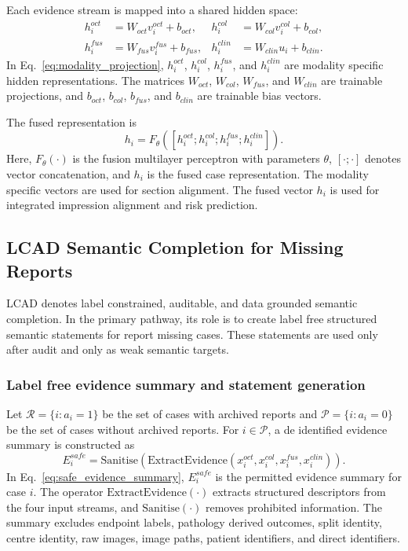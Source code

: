 Each evidence stream is mapped into a shared hidden space:
\begin{equation}
\begin{aligned}
h_i^{oct} &= W_{oct}v_i^{oct}+b_{oct}, &
h_i^{col} &= W_{col}v_i^{col}+b_{col},\\
h_i^{fus} &= W_{fus}v_i^{fus}+b_{fus}, &
h_i^{clin} &= W_{clin}u_i+b_{clin}.
\end{aligned}
\label{eq:modality_projection}
\end{equation}
In Eq.~\eqref{eq:modality_projection}, $h_i^{oct}$, $h_i^{col}$, $h_i^{fus}$, and $h_i^{clin}$ are modality specific hidden representations. The matrices $W_{oct}$, $W_{col}$, $W_{fus}$, and $W_{clin}$ are trainable projections, and $b_{oct}$, $b_{col}$, $b_{fus}$, and $b_{clin}$ are trainable bias vectors.

The fused representation is
\begin{equation}
h_i=F_{\theta}\left([h_i^{oct};h_i^{col};h_i^{fus};h_i^{clin}]\right).
\label{eq:fused_representation}
\end{equation}
Here, $F_{\theta}(\cdot)$ is the fusion multilayer perceptron with parameters $\theta$, $[\cdot;\cdot]$ denotes vector concatenation, and $h_i$ is the fused case representation. The modality specific vectors are used for section alignment. The fused vector $h_i$ is used for integrated impression alignment and risk prediction.

\subsection{LCAD Semantic Completion for Missing Reports}
\label{subsec:lcad_semantic_completion}

LCAD denotes label constrained, auditable, and data grounded semantic completion. In the primary pathway, its role is to create label free structured semantic statements for report missing cases. These statements are used only after audit and only as weak semantic targets.

\subsubsection{Label free evidence summary and statement generation}
\label{subsubsec:label_free_statement_generation}

Let $\mathcal{R}=\{i:a_i=1\}$ be the set of cases with archived reports and $\mathcal{P}=\{i:a_i=0\}$ be the set of cases without archived reports. For $i\in\mathcal{P}$, a de identified evidence summary is constructed as
\begin{equation}
E_i^{safe}=\mathrm{Sanitise}\left(\mathrm{ExtractEvidence}(x_i^{oct},x_i^{col},x_i^{fus},x_i^{clin})\right).
\label{eq:safe_evidence_summary}
\end{equation}
In Eq.~\eqref{eq:safe_evidence_summary}, $E_i^{safe}$ is the permitted evidence summary for case $i$. The operator $\mathrm{ExtractEvidence}(\cdot)$ extracts structured descriptors from the four input streams, and $\mathrm{Sanitise}(\cdot)$ removes prohibited information. The summary excludes endpoint labels, pathology derived outcomes, split identity, centre identity, raw images, image paths, patient identifiers, and direct identifiers.


